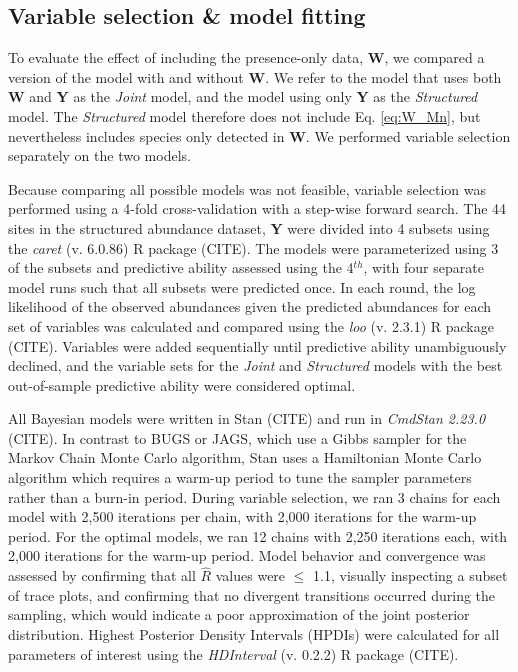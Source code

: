 \documentclass[preprint,review,times,12pt]{elsarticle}
\begin{document}
\subsection{Variable selection \& model fitting}
To evaluate the effect of including the presence-only data, \textbf{W}, we compared a version of the model with and without \textbf{W}. We refer to the model that uses both \textbf{W} and \textbf{Y} as the \emph{Joint} model, and the model using only \textbf{Y} as the \emph{Structured} model. The \emph{Structured} model therefore does not include Eq. \ref{eq:W_Mn}, but nevertheless includes species only detected in \textbf{W}. We performed variable selection separately on the two models.

Because comparing all possible models was not feasible, variable selection was performed using a 4-fold cross-validation with a step-wise forward search. The 44 sites in the structured abundance dataset, \textbf{Y} were divided into 4 subsets using the \emph{caret} (v. 6.0.86) R package (CITE). The models were parameterized using 3 of the subsets and predictive ability assessed using the 4$^{th}$, with four separate model runs such that all subsets were predicted once. In each round, the log likelihood of the observed abundances given the predicted abundances for each set of variables was calculated and compared using the \emph{loo} (v. 2.3.1) R package (CITE). Variables were added sequentially until predictive ability unambiguously declined, and the variable sets for the \emph{Joint} and \emph{Structured} models with the best out-of-sample predictive ability were considered optimal.

All Bayesian models were written in Stan (CITE) and run in \emph{CmdStan 2.23.0} (CITE). In contrast to BUGS or JAGS, which use a Gibbs sampler for the Markov Chain Monte Carlo algorithm, Stan uses a Hamiltonian Monte Carlo algorithm which requires a warm-up period to tune the sampler parameters rather than a burn-in period. During variable selection, we ran 3 chains for each model with 2,500 iterations per chain, with 2,000 iterations for the warm-up period. For the optimal models, we ran 12 chains with 2,250 iterations each, with 2,000 iterations for the warm-up period. Model behavior and convergence was assessed by confirming that all $\hat{R}$ values were $\leq$ 1.1, visually inspecting a subset of trace plots, and confirming that no divergent transitions occurred during the sampling, which would indicate a poor approximation of the joint posterior distribution. Highest Posterior Density Intervals (HPDIs) were calculated for all parameters of interest using the \emph{HDInterval} (v. 0.2.2) R package (CITE).
\end{document}
